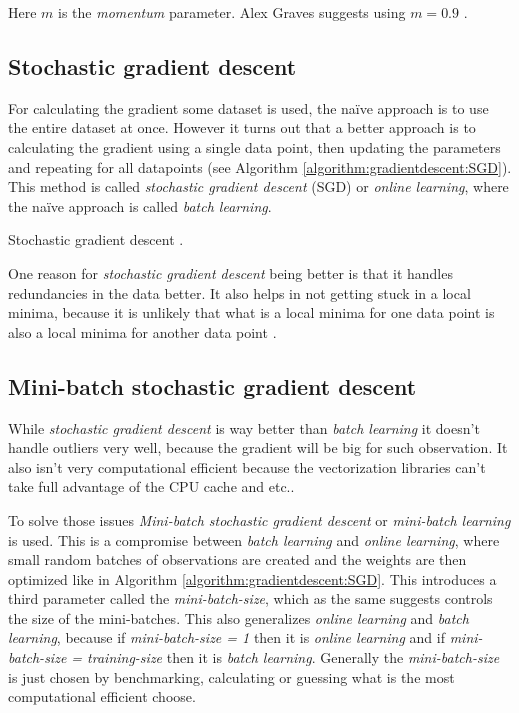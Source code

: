 Here $m$ is the \textit{momentum} parameter. Alex Graves suggests using $m = 0.9$ \cite{alexgraves}.

\subsection{Stochastic gradient descent}

For calculating the gradient some dataset is used, the naïve approach is to use the entire dataset at once. However it turns out that a better approach is to calculating the gradient using a single data point, then updating the parameters and repeating for all datapoints (see Algorithm \ref{algorithm:gradientdescent:SGD}). This method is called \textit{stochastic gradient descent} (SGD) or \textit{online learning}, where the naïve approach is called \textit{batch learning}.

\begin{algorithm}[h]
 \DontPrintSemicolon
 \caption{Stochastic gradient descent \cite{alexgraves}.}
 \label{algorithm:gradientdescent:SGD}
\end{algorithm}

One reason for \textit{stochastic gradient descent} being better is that it handles redundancies in the data better. It also helps in not getting stuck in a local minima, because it is unlikely that what is a local minima for one data point is also a local minima for another data point \cite{bishop}.

\subsection{Mini-batch stochastic gradient descent}

While \textit{stochastic gradient descent} is way better than \textit{batch learning} it doesn't handle outliers very well, because the gradient will be big for such observation. It also isn't very computational efficient because the vectorization libraries can't take full advantage of the CPU cache and etc..

To solve those issues \textit{Mini-batch stochastic gradient descent} or \textit{mini-batch learning} is used. This is a compromise between \textit{batch learning} and \textit{online learning}, where small random batches of observations are created and the weights are then optimized like in Algorithm \ref{algorithm:gradientdescent:SGD}. This introduces a third parameter called the \textit{mini-batch-size}, which as the same suggests controls the size of the mini-batches. This also generalizes \textit{online learning} and \textit{batch learning}, because if \textit{mini-batch-size = 1} then it is \textit{online learning} and if \textit{mini-batch-size = training-size} then it is \textit{batch learning}. Generally the \textit{mini-batch-size} is just chosen by benchmarking, calculating or guessing what is the most computational efficient choose.

